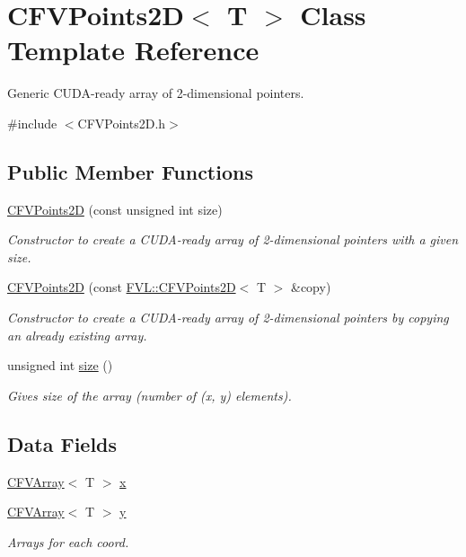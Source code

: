 \hypertarget{classFVL_1_1CFVPoints2D}{
\section{CFVPoints2D$<$ T $>$ Class Template Reference}
\label{d5/dfb/classFVL_1_1CFVPoints2D}
}


Generic CUDA-\/ready array of 2-\/dimensional pointers.  




{\ttfamily \#include $<$CFVPoints2D.h$>$}

\subsection*{Public Member Functions}
\begin{DoxyCompactItemize}
\item 
\hyperlink{classFVL_1_1CFVPoints2D_a63bf7c15d2279b68774bd55c5813b3e0}{CFVPoints2D} (const unsigned int size)
\begin{DoxyCompactList}\small\item\em Constructor to create a CUDA-\/ready array of 2-\/dimensional pointers with a given size. \item\end{DoxyCompactList}\item 
\hyperlink{classFVL_1_1CFVPoints2D_a89b71fc079d99459852b91dfc2517958}{CFVPoints2D} (const \hyperlink{classFVL_1_1CFVPoints2D}{FVL::CFVPoints2D}$<$ T $>$ \&copy)
\begin{DoxyCompactList}\small\item\em Constructor to create a CUDA-\/ready array of 2-\/dimensional pointers by copying an already existing array. \item\end{DoxyCompactList}\item 
unsigned int \hyperlink{classFVL_1_1CFVPoints2D_a7033bafa80d2349b9b0da59d8c486767}{size} ()
\begin{DoxyCompactList}\small\item\em Gives size of the array (number of (x, y) elements). \item\end{DoxyCompactList}\end{DoxyCompactItemize}
\subsection*{Data Fields}
\begin{DoxyCompactItemize}
\item 
\hyperlink{classFVL_1_1CFVArray}{CFVArray}$<$ T $>$ \hyperlink{classFVL_1_1CFVPoints2D_ae3f7cddcef8c7dca840ce2f51e60e159}{x}
\item 
\hyperlink{classFVL_1_1CFVArray}{CFVArray}$<$ T $>$ \hyperlink{classFVL_1_1CFVPoints2D_a640cc15f66d3b56162f7455968907c41}{y}
\begin{DoxyCompactList}\small\item\em Arrays for each coord. \item\end{DoxyCompactList}\end{DoxyCompactItemize}


